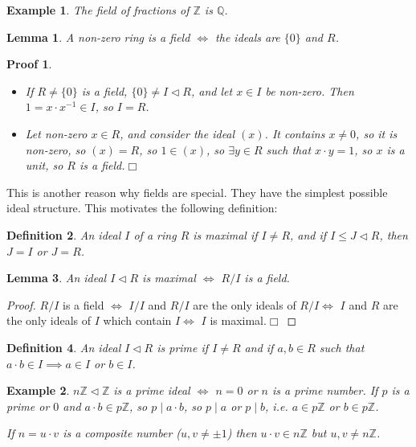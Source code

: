 \documentclass{article}
\theoremstyle{plain}\theoremheaderfont{\normalfont\itshape}\theorembodyfont{\rmfamily}\theoremseparator{.}\newtheorem*{rem}{Remark}\newtheorem*{ex}{Example}\newtheorem*{proof}{Proof}\newtheorem*{altp}{Alternative proof}\newtheorem*{nonex}{Non-Example}
\theoremstyle{plain}\theoremheaderfont{\normalfont\bfseries}\theorembodyfont{\rmfamily}\theoremseparator{.}\newtheorem{thm}{Theorem}[section]\newtheorem{lem}[thm]{Lemma}\newtheorem{prop}[thm]{Proposition}\newtheorem*{cor}{Corollary}\newtheorem{defn}[thm]{Definition}\newtheorem{clm}[thm]{Claim}\newtheorem{clminproof}{Claim}\newtheorem*{notn}{Notation}\newtheorem*{exer}{Exercise}\newtheorem*{lemnn}{Lemma}
\theoremstyle{break}\theoremheaderfont{\normalfont\itshape}\theorembodyfont{\rmfamily}\theoremseparator{.\medskip}\newtheorem*{proofskip}{Proof}\newtheorem*{exs}{Examples}\newtheorem*{rems}{Remarks}\newtheorem*{obs}{Observations}
\theoremstyle{break}\theoremheaderfont{\normalfont\bfseries}\theorembodyfont{\rmfamily}\theoremseparator{.\medskip}\newtheorem{lemskip}[thm]{Lemma}\newtheorem{defnskip}[thm]{Definition}\newtheorem{propskip}[thm]{Proposition}\newtheorem{thmskip}[thm]{Theorem}
\numberwithin{equation}{section}
\newcommand{\qed}{\hfill\ensuremath{\Box}}
\newcommand{\ZZ}{\mathbb{Z}}
\newcommand{\QQ}{\mathbb{Q}}
\begin{document}
    \begin{ex}
        The field of fractions of \(\ZZ\) is \(\QQ\).
    \end{ex}
    \begin{lem}
        A non-zero ring is a field \(\iff\) the ideals are \(\{0\}\) and \(R\).
    \end{lem}
    \begin{proofskip}
        \begin{itemize}[topsep=0pt]
            \item[(\(\Rightarrow\))] If \(R\ne\{0\}\) is a field, \(\{0\}\ne I\lhd R\), and let \(x\in I\) be non-zero. Then \(1=x\cdot x^{-1}\in I\), so \(I=R\).
            \item[(\(\Leftarrow\))] Let non-zero \(x\in R\), and consider the ideal \((x)\). It contains \(x\ne 0\), so it is non-zero, so \((x)=R\), so \(1\in (x)\), so \(\exists y\in R\) such that \(x\cdot y=1\), so \(x\) is a unit, so \(R\) is a field.\qed
        \end{itemize}
    \end{proofskip}
    This is another reason why fields are special. They have the simplest possible ideal structure. This motivates the following definition:
    \begin{defn}
        An ideal \(I\) of a ring \(R\) is \textit{maximal} if \(I\ne R\), and if \(I\le J\lhd R\), then \(J=I\) or \(J=R\).
    \end{defn}
    \begin{lem}
        An ideal \(I\lhd R\) is maximal \(\iff\) \(R/I\) is a field.
    \end{lem}
    \begin{proof}
        \(R/I\) is a field \(\iff\) \(I/I\) and \(R/I\) are the only ideals of \(R/I\iff\) \(I\) and \(R\) are the only ideals of \(I\) which contain \(I\iff\) \(I\) is maximal.\qed
    \end{proof}
    \begin{defn}
        An ideal \(I\lhd R\) is \textit{prime} if \(I\ne R\) and if \(a,b\in R\) such that \(a\cdot b\in I\implies a\in I\) or \(b\in I\).
    \end{defn}
    \begin{ex}
        \(n\ZZ\lhd\ZZ\) is a prime ideal \(\iff\) \(n=0\) or \(n\) is a prime number. If \(p\) is a prime or \(0\) and \(a\cdot b\in p\ZZ\), so \(p\mid a\cdot b\), so \(p\mid a\) or \(p\mid b\), i.e. \(a\in p\ZZ\) or \(b\in p\ZZ\).

        If \(n=u\cdot v\) is a composite number (\(u,v\ne\pm 1\)) then \(u\cdot v\in n\ZZ\) but \(u,v\ne n\ZZ\).
    \end{ex}
\end{document}
